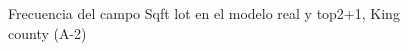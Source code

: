 \begin{figure}[H]
    \centering
    
    \caption{Frecuencia del campo Sqft lot en el modelo real y top2+1, King county (A-2)}
    \label{frecuency-top2+1-sqft lot}
\end{figure}